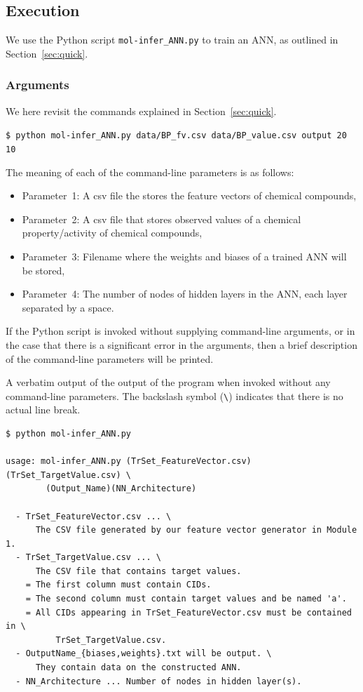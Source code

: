 \documentclass[11pt,titlepage,dvipdfmx,twoside]{book}
\newcommand{\secref}[1]{Section~\ref{sec:#1}}
\begin{document}
  
\subsection{Execution}

We use the Python script {\tt mol-infer\_ANN.py}
to train an ANN, as outlined in \secref{quick}.


\subsubsection{Arguments}
We here revisit the commands 
explained in \secref{quick}.
\begin{oframed}
{\small
\verb|$ python mol-infer_ANN.py data/BP_fv.csv data/BP_value.csv output 20 10|
}
\end{oframed}
The meaning of each of the command-line parameters is as follows:
\begin{itemize}
\item Parameter~1: 
  A csv file the stores the feature vectors of chemical compounds,
  
\item Parameter~2: 
  A csv file that stores observed values of a chemical property/activity of chemical compounds,
  
\item Parameter~3: 
Filename where the weights and biases of a trained ANN will be stored,

\item Parameter~4: 
The number of nodes of hidden layers in the ANN, each layer separated by a space.
\end{itemize}

If the Python script is invoked without supplying command-line arguments,
or in the case that there is a significant error in the arguments,
then a brief description of the command-line parameters will be printed.
\begin{oframed}
A verbatim output of the output of the program when invoked without any command-line parameters. The backslash symbol (\verb|\|) indicates that there is no actual line break. 
  {\small
\begin{verbatim}
$ python mol-infer_ANN.py 

usage: mol-infer_ANN.py (TrSet_FeatureVector.csv)(TrSet_TargetValue.csv) \
	    (Output_Name)(NN_Architecture)
                  
  - TrSet_FeatureVector.csv ... \
      The CSV file generated by our feature vector generator in Module 1.
  - TrSet_TargetValue.csv ... \
      The CSV file that contains target values.
    = The first column must contain CIDs.
    = The second column must contain target values and be named 'a'. 
    = All CIDs appearing in TrSet_FeatureVector.csv must be contained in \
	      TrSet_TargetValue.csv. 
  - OutputName_{biases,weights}.txt will be output. \
      They contain data on the constructed ANN. 
  - NN_Architecture ... Number of nodes in hidden layer(s).
\end{verbatim}
  }
  \end{oframed}
\end{document}
